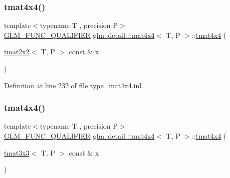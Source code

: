 \mbox{\label{structglm_1_1detail_1_1tmat4x4_a583fe3150c192a6405b2042f713ffc67}} 
\subsubsection{\texorpdfstring{tmat4x4()}{tmat4x4()}\hspace{0.1cm}{\footnotesize\ttfamily [11/22]}}
{\footnotesize\ttfamily template$<$typename T , precision P$>$ \\
\hyperlink{setup_8hpp_a33fdea6f91c5f834105f7415e2a64407}{G\+L\+M\+\_\+\+F\+U\+N\+C\+\_\+\+Q\+U\+A\+L\+I\+F\+I\+ER} \hyperlink{structglm_1_1detail_1_1tmat4x4}{glm\+::detail\+::tmat4x4}$<$ T, P $>$\+::\hyperlink{structglm_1_1detail_1_1tmat4x4}{tmat4x4} (\begin{DoxyParamCaption}\item[{\hyperlink{structglm_1_1detail_1_1tmat2x2}{tmat2x2}$<$ T, P $>$ const \&}]{x }\end{DoxyParamCaption})\hspace{0.3cm}{\ttfamily [explicit]}}



Definition at line 232 of file type\+\_\+mat4x4.\+inl.

\mbox{\label{structglm_1_1detail_1_1tmat4x4_af33330c114b10b960bb957f43dc33bb1}} 
\subsubsection{\texorpdfstring{tmat4x4()}{tmat4x4()}\hspace{0.1cm}{\footnotesize\ttfamily [12/22]}}
{\footnotesize\ttfamily template$<$typename T , precision P$>$ \\
\hyperlink{setup_8hpp_a33fdea6f91c5f834105f7415e2a64407}{G\+L\+M\+\_\+\+F\+U\+N\+C\+\_\+\+Q\+U\+A\+L\+I\+F\+I\+ER} \hyperlink{structglm_1_1detail_1_1tmat4x4}{glm\+::detail\+::tmat4x4}$<$ T, P $>$\+::\hyperlink{structglm_1_1detail_1_1tmat4x4}{tmat4x4} (\begin{DoxyParamCaption}\item[{\hyperlink{structglm_1_1detail_1_1tmat3x3}{tmat3x3}$<$ T, P $>$ const \&}]{x }\end{DoxyParamCaption})\hspace{0.3cm}{\ttfamily [explicit]}}



